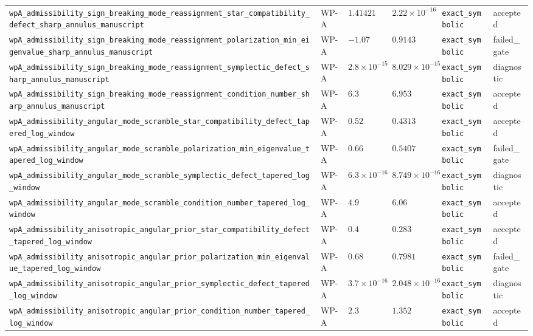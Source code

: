 \begin{table}[t]
\begin{tabular}{@{}llllll@{}}
\texttt{wpA\_admissibility\_sign\_breaking\_mode\_reassignment\_star\_compatibility\_defect\_sharp\_annulus\_manuscript} & WP-A & $1.41421$ & $2.22\times10^{-16}$ & \texttt{exact\_symbolic} & accepted \\
\texttt{wpA\_admissibility\_sign\_breaking\_mode\_reassignment\_polarization\_min\_eigenvalue\_sharp\_annulus\_manuscript} & WP-A & $-1.07$ & $0.9143$ & \texttt{exact\_symbolic} & failed\_gate \\
\texttt{wpA\_admissibility\_sign\_breaking\_mode\_reassignment\_symplectic\_defect\_sharp\_annulus\_manuscript} & WP-A & $2.8\times10^{-15}$ & $8.029\times10^{-15}$ & \texttt{exact\_symbolic} & diagnostic \\
\texttt{wpA\_admissibility\_sign\_breaking\_mode\_reassignment\_condition\_number\_sharp\_annulus\_manuscript} & WP-A & $6.3$ & $6.953$ & \texttt{exact\_symbolic} & accepted \\
\texttt{wpA\_admissibility\_angular\_mode\_scramble\_star\_compatibility\_defect\_tapered\_log\_window} & WP-A & $0.52$ & $0.4313$ & \texttt{exact\_symbolic} & accepted \\
\texttt{wpA\_admissibility\_angular\_mode\_scramble\_polarization\_min\_eigenvalue\_tapered\_log\_window} & WP-A & $0.66$ & $0.5407$ & \texttt{exact\_symbolic} & failed\_gate \\
\texttt{wpA\_admissibility\_angular\_mode\_scramble\_symplectic\_defect\_tapered\_log\_window} & WP-A & $6.3\times10^{-16}$ & $8.749\times10^{-16}$ & \texttt{exact\_symbolic} & diagnostic \\
\texttt{wpA\_admissibility\_angular\_mode\_scramble\_condition\_number\_tapered\_log\_window} & WP-A & $4.9$ & $6.06$ & \texttt{exact\_symbolic} & accepted \\
\texttt{wpA\_admissibility\_anisotropic\_angular\_prior\_star\_compatibility\_defect\_tapered\_log\_window} & WP-A & $0.4$ & $0.283$ & \texttt{exact\_symbolic} & accepted \\
\texttt{wpA\_admissibility\_anisotropic\_angular\_prior\_polarization\_min\_eigenvalue\_tapered\_log\_window} & WP-A & $0.68$ & $0.7981$ & \texttt{exact\_symbolic} & failed\_gate \\
\texttt{wpA\_admissibility\_anisotropic\_angular\_prior\_symplectic\_defect\_tapered\_log\_window} & WP-A & $3.7\times10^{-16}$ & $2.048\times10^{-16}$ & \texttt{exact\_symbolic} & diagnostic \\
\texttt{wpA\_admissibility\_anisotropic\_angular\_prior\_condition\_number\_tapered\_log\_window} & WP-A & $2.3$ & $1.352$ & \texttt{exact\_symbolic} & accepted \\

\end{tabular}
\end{table}
